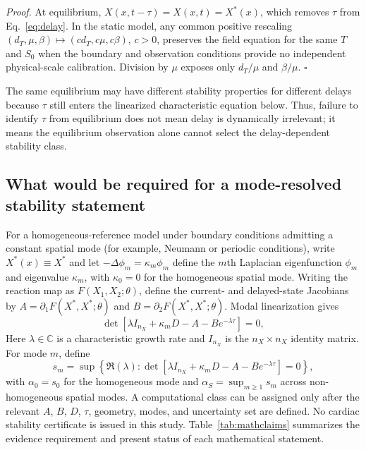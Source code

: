 \documentclass[preprint,11pt]{elsarticle}
\begin{document}
\noindent\emph{Proof.} At equilibrium, $X(x,t-\tau)=X(x,t)=X^*(x)$, which removes $\tau$ from Eq.~\eqref{eq:delay}. In the static model, any common positive rescaling $(d_T,\mu,\beta)\mapsto(c d_T,c\mu,c\beta)$, $c>0$, preserves the field equation for the same $T$ and $S_0$ when the boundary and observation conditions provide no independent physical-scale calibration. Division by $\mu$ exposes only $d_T/\mu$ and $\beta/\mu$. \hfill$\square$

The same equilibrium may have different stability properties for different delays because $\tau$ still enters the linearized characteristic equation below. Thus, failure to identify $\tau$ from equilibrium does not mean delay is dynamically irrelevant; it means the equilibrium observation alone cannot select the delay-dependent stability class.

\subsection{What would be required for a mode-resolved stability statement}
For a homogeneous-reference model under boundary conditions admitting a constant spatial mode (for example, Neumann or periodic conditions), write $X^*(x)\equiv X^*$ and let $-\Delta\phi_m=\kappa_m\phi_m$ define the $m$th Laplacian eigenfunction $\phi_m$ and eigenvalue $\kappa_m$, with $\kappa_0=0$ for the homogeneous spatial mode. Writing the reaction map as $F(X_1,X_2;\theta)$, define the current- and delayed-state Jacobians by $A=\partial_1F(X^*,X^*;\theta)$ and $B=\partial_2F(X^*,X^*;\theta)$. Modal linearization gives
\begin{equation}
\det\!\left[\lambda I_{n_X}+\kappa_mD-A-Be^{-\lambda\tau}\right]=0,
\label{eq:char}
\end{equation}
Here $\lambda\in\mathbb{C}$ is a characteristic growth rate and $I_{n_X}$ is the $n_X\times n_X$ identity matrix. For mode $m$, define
\[
s_m=\sup\left\{\Re(\lambda):\det\!\left[\lambda I_{n_X}+\kappa_mD-A-Be^{-\lambda\tau}\right]=0\right\},
\]
with $\alpha_0=s_0$ for the homogeneous mode and $\alpha_S=\sup_{m\ge1}s_m$ across non-homogeneous spatial modes. A computational class can be assigned only after the relevant $A$, $B$, $D$, $\tau$, geometry, modes, and uncertainty set are defined. No cardiac stability certificate is issued in this study. Table~\ref{tab:mathclaims} summarizes the evidence requirement and present status of each mathematical statement.
\end{document}
